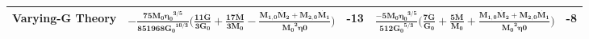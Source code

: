 \documentclass[11pt]{article}
\begin{document}
\begin{tabular}{ |p{1cm}|p{6.9cm}|p{0.4cm}|p{6cm}|p{0.3cm}|}
 \hline
 \vspace{20pt}
 \tiny Varying-G Theory&\rule{0pt}{4ex}\tiny $\bm{-\frac{75 M_0 {\eta_0}^{3/5}}{851968 {G_0}^{10/3}} \bigg(\frac{11 \dot{G}}{3 G_0} + \frac{17 \dot{M}}{3M_0}-\frac{M_{1,0}\dot{M_2}+M_{2,0}\dot{M_1}}{{M_0}^2 \eta0}\bigg)}$&\tiny-13&\tiny$\bm{\frac{-5 M_0 {\eta_0}^{3/5}}{512 {G_0}^{5/3}} \bigg(\frac{7 \dot{G}}{ G_0} + \frac{5\dot{M}}{M_0}+\frac{M_{1,0}\dot{M_2}+M_{2,0}\dot{M_1}}{{M_0}^2 \eta0}\bigg)}$&\tiny-8\\
\hline
\end{tabular}
 
 
 

 





\end{document}
